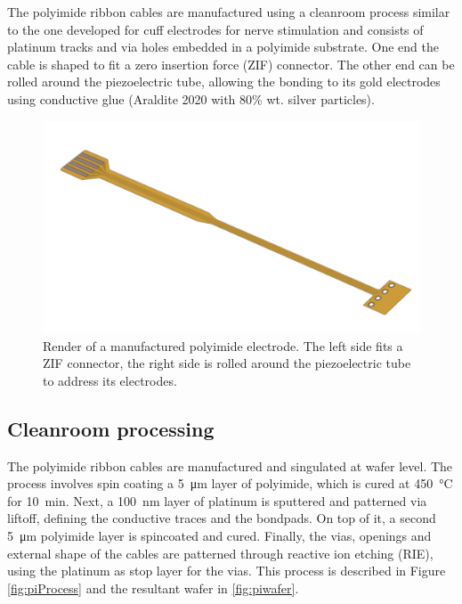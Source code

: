 The polyimide ribbon cables are manufactured using a cleanroom process similar to the one developed for cuff electrodes for nerve stimulation \cite{Rodriguez2000} and consists of platinum tracks and via holes embedded in a polyimide substrate. One end the cable is shaped to fit a zero insertion force (ZIF) connector. The other end can be rolled around the piezoelectric tube, allowing the bonding to its gold electrodes using conductive glue (Araldite 2020 with 80\% wt. silver particles).

\begin{figure}[h!]\centering \includegraphics[width=15cm]{figures/40_Fabrication/PI/render.JPG}
      \caption{Render of a manufactured polyimide electrode. The left side fits a ZIF connector, the right side is rolled around the piezoelectric tube to address its electrodes.}
      \label{fig:piRender}
\end{figure}



\subsection*{Cleanroom processing}
The polyimide ribbon cables are manufactured and singulated at wafer level. The process involves spin coating a \SI{5}{\micro\meter} layer of polyimide, which is cured at \SI{450}{\celsius} for \SI{10}{\minute}. Next, a \SI{100}{\nano\meter} layer of platinum is sputtered and patterned via liftoff, defining the conductive traces and the bondpads. On top of it, a second \SI{5}{\micro\meter} polyimide layer is spincoated and cured. Finally, the vias, openings and external shape of the cables are patterned through reactive ion etching (RIE), using the platinum as stop layer for the vias. This process is described in Figure \ref{fig:piProcess} and the resultant wafer in \autoref{fig:piwafer}.


